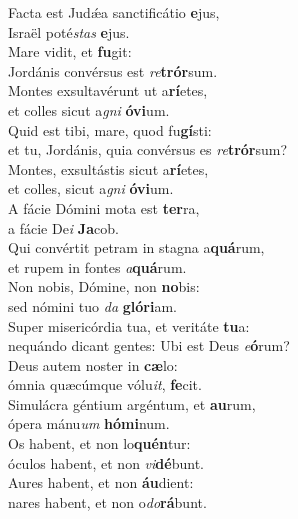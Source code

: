 \evenverse Facta est Judǽa sanctificátio \textbf{e}jus,~\*\\
\evenverse Israël poté\textit{stas} \textbf{e}jus.\\
\oddverse Mare vidit, et \textbf{fu}git:~\*\\
\oddverse Jordánis convérsus est \textit{re}\textbf{trór}sum.\\
\evenverse Montes exsultavérunt ut a\textbf{rí}etes,~\*\\
\evenverse et colles sicut a\textit{gni} \textbf{ó}\textbf{vi}um.\\
\oddverse Quid est tibi, mare, quod fu\textbf{gí}sti:~\*\\
\oddverse et tu, Jordánis, quia convérsus es \textit{re}\textbf{trór}sum?\\
\evenverse Montes, exsultástis sicut a\textbf{rí}etes,~\*\\
\evenverse et colles, sicut a\textit{gni} \textbf{ó}\textbf{vi}um.\\
\oddverse A fácie Dómini mota est \textbf{ter}ra,~\*\\
\oddverse a fácie De\textit{i} \textbf{Ja}cob.\\
\evenverse Qui convértit petram in stagna a\textbf{quá}rum,~\*\\
\evenverse et rupem in fontes \textit{a}\textbf{quá}rum.\\
\oddverse Non nobis, Dómine, non \textbf{no}bis:~\*\\
\oddverse sed nómini tuo \textit{da} \textbf{gló}\textbf{ri}am.\\
\evenverse Super misericórdia tua, et veritáte \textbf{tu}a:~\*\\
\evenverse nequándo dicant gentes: Ubi est Deus \textit{e}\textbf{ó}rum?\\
\oddverse Deus autem noster in \textbf{cæ}lo:~\*\\
\oddverse ómnia quæcúmque vólu\textit{it}, \textbf{fe}cit.\\
\evenverse Simulácra géntium argéntum, et \textbf{au}rum,~\*\\
\evenverse ópera mánu\textit{um} \textbf{hó}\textbf{mi}num.\\
\oddverse Os habent, et non lo\textbf{quén}tur:~\*\\
\oddverse óculos habent, et non \textit{vi}\textbf{dé}bunt.\\
\evenverse Aures habent, et non \textbf{áu}dient:~\*\\
\evenverse nares habent, et non o\textit{do}\textbf{rá}bunt.\\
